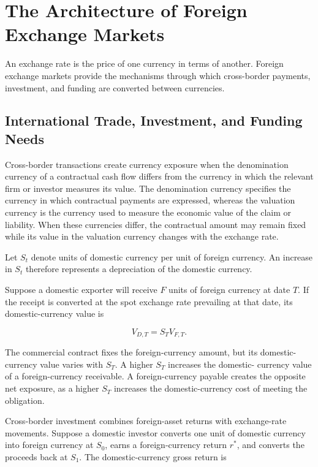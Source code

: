 \section{The Architecture of Foreign Exchange Markets}

An exchange rate is the price of one currency in terms
of another. Foreign exchange markets provide the
mechanisms through which cross-border payments,
investment, and funding are converted between
currencies.

\subsection{International Trade, Investment, and Funding Needs}

Cross-border transactions create currency exposure when
the denomination currency of a contractual cash flow
differs from the currency in which the relevant firm
or investor measures its value. The denomination
currency specifies the currency in which contractual
payments are expressed, whereas the valuation currency
is the currency used to measure the economic value of
the claim or liability. When these currencies differ,
the contractual amount may remain fixed while its
value in the valuation currency changes with the
exchange rate.

Let $S_t$ denote units of domestic currency per unit of foreign currency. An increase in $S_t$ therefore represents a depreciation of the domestic currency.

Suppose a domestic exporter will receive $F$ units
of foreign currency at date $T$. If the receipt is
converted at the spot exchange rate prevailing at
that date, its domestic-currency value is

\begin{equation}
V_{D,T}=S_T V_{F,T}.
\label{eq:ch10-export-receivable-value}
\end{equation}

The commercial contract fixes the foreign-currency
amount, but its domestic-currency value varies
with $S_T$. A higher $S_T$ increases the domestic-
currency value of a foreign-currency receivable.
A foreign-currency payable creates the opposite
net exposure, as a higher $S_T$ increases the
domestic-currency cost of meeting the obligation.

Cross-border investment combines foreign-asset returns with exchange-rate movements. Suppose a domestic investor converts one unit of domestic currency into foreign currency at $S_0$, earns a foreign-currency return $r^{*}$, and converts the proceeds back at $S_1$. The domestic-currency gross return is

